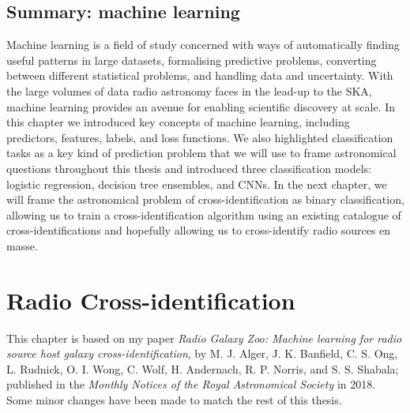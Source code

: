 \documentclass[11pt, a4paper]{book}
\begin{document}
\section{Summary: machine learning}
\label{sec:summary-ml}

    Machine learning is a field of study concerned with ways of automatically finding useful patterns in large datasets, formalising predictive problems, converting between different statistical problems, and handling data and uncertainty. With the large volumes of data radio astronomy faces in the lead-up to the SKA, machine learning provides an avenue for enabling scientific discovery at scale. In this chapter we introduced key concepts of machine learning, including predictors, features, labels, and loss functions. We also highlighted classification tasks as a key kind of prediction problem that we will use to frame astronomical questions throughout this thesis and introduced three classification models: logistic regression, decision tree ensembles, and CNNs. In the next chapter, we will frame the astronomical problem of cross-identification as binary classification, allowing us to train a cross-identification algorithm using an existing catalogue of cross-identifications and hopefully allowing us to cross-identify radio sources en masse.

\chapter{Radio Cross-identification}
\label{cha:cross-id}


This chapter is based on my paper \emph{Radio Galaxy Zoo: Machine learning for radio source host galaxy cross-identification}, by M. J. Alger, J. K. Banfield, C. S. Ong, L. Rudnick, O. I. Wong, C. Wolf, H. Andernach, R. P. Norris, and S. S. Shabala; published in the \emph{Monthly Notices of the Royal Astronomical Society} in 2018. Some minor changes have been made to match the rest of this thesis.\\
\end{document}
